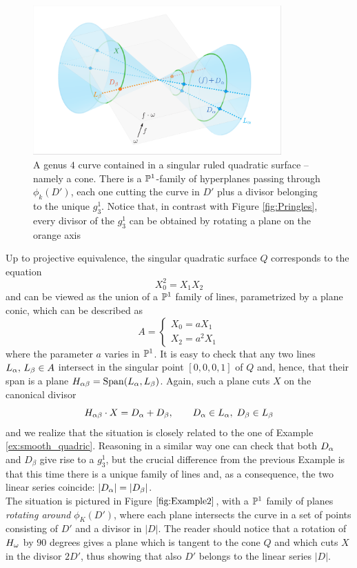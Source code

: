  	\begin{example}\label{ex:singular_quadric}

	 	\begin{figure}[h]
			\centering
			\includegraphics[width=0.85\textwidth]{Cone2.pdf}
			\caption{ A genus $4$ curve contained in a singular ruled quadratic surface -- namely a cone. There is a $\mathbb{P}^1$-family of hyperplanes passing through $\phi_k(D')$, each one cutting the curve in $D'$ plus a divisor belonging to the unique $g_3^1$. Notice that, in contrast with Figure \ref{fig:Pringles}, every divisor of the $g_3^1$ can be obtained by rotating a plane on the orange axis }
			\label{fig:Cone}
		\end{figure}

		Up to projective equivalence, the singular quadratic surface $Q$ corresponds to the equation
 		$$ X_0^2 = X_1 X_2 $$
 		and can be viewed as the union of a $\mathbb{P}^1$ family of lines, parametrized by a plane conic, which can be described as
 		$$ A= \begin{cases} X_0=a X_1 \\ X_2=a^2 X_1 \end{cases} $$
 		where the parameter $a$ varies in $\mathbb{P}^1$. It is easy to check that any two lines $L_\alpha,\, L_\beta \in A$ intersect in the singular point $[0,0,0,1]$ of $Q$ and, hence, that their span is a plane $H_{\alpha\beta} = \operatorname{Span}(L_\alpha, L_\beta)$. 
 		Again, such a plane cuts $X$ on the canonical divisor
 		$$ H_{\alpha\beta} \cdot X = D_\alpha + D_\beta, \qquad D_\alpha\in L_\alpha, \; D_\beta\in L_\beta $$
 		and we realize that the situation is closely related to the one of Example \ref{ex:smooth_quadric}. 
 		Reasoning in a similar way one can check that both $D_\alpha$ and $D_\beta$ give rise to a $g_3^1$, but the crucial difference from the previous Example is that this time there is a unique family of lines and, as a consequence, the two linear series coincide: $|D_\alpha|=|D_\beta|$.\\
 		The situation is pictured in Figure $\ref{fig:Example2}$, with a $\mathbb{P}^1$ family of planes \emph{rotating around} $\phi_K(D')$, where each plane intersects the curve in a set of points consisting of $D'$ and a divisor in $|D|$. The reader should notice that a rotation of $H_\omega$ by $90$ degrees gives a plane which is tangent to the cone $Q$ and which cuts $X$ in the divisor $2D'$, thus showing that also $D'$ belongs to the linear series $|D|$.

 	
 	\end{example}


